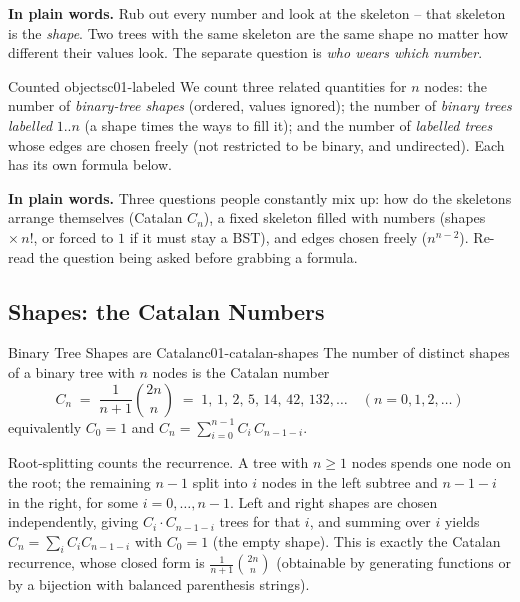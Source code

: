 \noindent\textbf{In plain words.} Rub out every number and look at the skeleton -- that
skeleton is the \emph{shape}. Two trees with the same skeleton are the same shape no
matter how different their values look. The separate question is \emph{who wears which
number}.

\begin{definition}{Counted objects}{c01-labeled}
We count three related quantities for $n$ nodes: the number of \emph{binary-tree shapes}
(ordered, values ignored); the number of \emph{binary trees labelled} $1..n$ (a shape times
the ways to fill it); and the number of \emph{labelled trees} whose edges are chosen freely
(not restricted to be binary, and undirected). Each has its own formula below.
\end{definition}

\noindent\textbf{In plain words.} Three questions people constantly mix up: how do the
skeletons arrange themselves (Catalan $C_n$), a fixed skeleton filled with numbers
(shapes $\times\,n!$, or forced to $1$ if it must stay a BST), and edges chosen freely
($n^{n-2}$). Re-read the question being asked before grabbing a formula.

\subsection{Shapes: the Catalan Numbers}

\begin{theorem}{Binary Tree Shapes are Catalan}{c01-catalan-shapes}
The number of distinct shapes of a binary tree with $n$ nodes is the Catalan number
\[
  C_n \;=\; \frac{1}{n+1}\binom{2n}{n} \;=\; 1,\,1,\,2,\,5,\,14,\,42,\,132,\dots
  \quad (n = 0,1,2,\dots)
\]
equivalently $C_0 = 1$ and $C_n = \sum_{i=0}^{n-1} C_i\,C_{n-1-i}$.
\end{theorem}
\begin{proofbox}
Root-splitting counts the recurrence. A tree with $n\ge 1$ nodes spends one node on the
root; the remaining $n-1$ split into $i$ nodes in the left subtree and $n-1-i$ in the
right, for some $i = 0,\dots,n-1$. Left and right shapes are chosen independently, giving
$C_i \cdot C_{n-1-i}$ trees for that $i$, and summing over $i$ yields
$C_n = \sum_{i} C_i C_{n-1-i}$ with $C_0 = 1$ (the empty shape). This is exactly the
Catalan recurrence, whose closed form is $\frac{1}{n+1}\binom{2n}{n}$ (obtainable by
generating functions or by a bijection with balanced parenthesis strings).
\end{proofbox}

